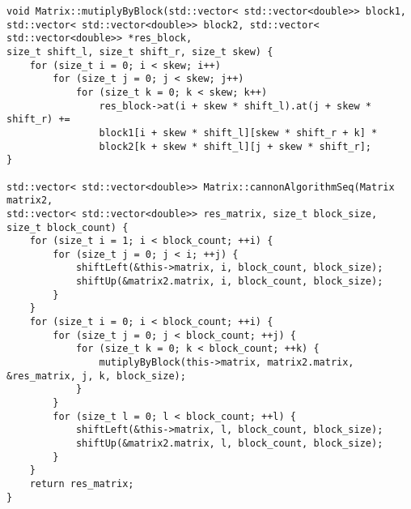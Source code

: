 \documentclass{report}
\begin{document}
\begin{lstlisting}
void Matrix::mutiplyByBlock(std::vector< std::vector<double>> block1,
std::vector< std::vector<double>> block2, std::vector< std::vector<double>> *res_block,
size_t shift_l, size_t shift_r, size_t skew) {
    for (size_t i = 0; i < skew; i++)
        for (size_t j = 0; j < skew; j++)
            for (size_t k = 0; k < skew; k++)
                res_block->at(i + skew * shift_l).at(j + skew * shift_r) +=
                block1[i + skew * shift_l][skew * shift_r + k] *
                block2[k + skew * shift_l][j + skew * shift_r];
}

std::vector< std::vector<double>> Matrix::cannonAlgorithmSeq(Matrix matrix2,
std::vector< std::vector<double>> res_matrix, size_t block_size,
size_t block_count) {
    for (size_t i = 1; i < block_count; ++i) {
        for (size_t j = 0; j < i; ++j) {
            shiftLeft(&this->matrix, i, block_count, block_size);
            shiftUp(&matrix2.matrix, i, block_count, block_size);
        }
    }
    for (size_t i = 0; i < block_count; ++i) {
        for (size_t j = 0; j < block_count; ++j) {
            for (size_t k = 0; k < block_count; ++k) {
                mutiplyByBlock(this->matrix, matrix2.matrix, &res_matrix, j, k, block_size);
            }
        }
        for (size_t l = 0; l < block_count; ++l) {
            shiftLeft(&this->matrix, l, block_count, block_size);
            shiftUp(&matrix2.matrix, l, block_count, block_size);
        }
    }
    return res_matrix;
}
\end{lstlisting}
\end{document}
